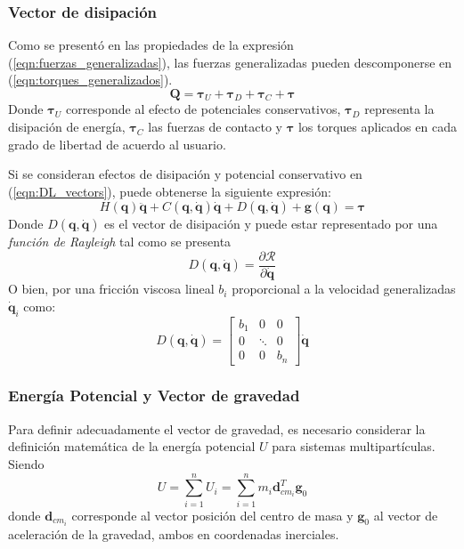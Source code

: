    \subsubsection{Vector de disipación}
    Como se presentó en las propiedades de la expresión (\ref{eqn:fuerzas_generalizadas}), las fuerzas generalizadas pueden descomponerse en (\ref{eqn:torques_generalizados}).
    \begin{equation}
        \label{eqn:torques_generalizados}
         \boldsymbol{Q} = \boldsymbol{\tau}_U + \boldsymbol{\tau}_D + \boldsymbol{\tau}_C + \boldsymbol{\tau}
    \end{equation}
    Donde $\boldsymbol{\tau}_U$ corresponde al efecto de potenciales conservativos, $\boldsymbol{\tau}_D$ representa la disipación de energía, $\boldsymbol{\tau}_C$
    las fuerzas de contacto y $\boldsymbol{\tau}$ los torques aplicados en cada grado de libertad de acuerdo al usuario. 
    
    Si se consideran efectos de disipación y potencial conservativo en (\ref{eqn:DL_vectors}), puede obtenerse la siguiente expresión:
    \begin{equation}
        \label{eqn:DL_final}
        H(\boldsymbol{q}) \boldsymbol{\ddot{q}} + C(\boldsymbol{q}, \boldsymbol{\dot{q}}) \boldsymbol{\dot{q}} + D(\boldsymbol{q}, \boldsymbol{\dot{q}})
        + \boldsymbol{g}(\boldsymbol{q}) = \boldsymbol{\tau}
    \end{equation}
    Donde $D(\boldsymbol{q}, \boldsymbol{\dot{q}})$ es el vector de disipación y puede estar representado por una \emph{función de Rayleigh} tal como se presenta
    \begin{equation}
        \label{eqn:disipacion_ray}
        D(\boldsymbol{q}, \boldsymbol{\dot{q}}) = \frac{\partial \mathcal{R}}{\partial \boldsymbol{\dot{q}}}
    \end{equation} 
    O bien, por una fricción viscosa lineal $b_i$ proporcional a la velocidad generalizadas $\boldsymbol{\dot{q}}_i$ como:
    \begin{equation}
        \label{eqn:disipacion_simple}
        D(\boldsymbol{q}, \boldsymbol{\dot{q}}) = \begin{bmatrix} b_1 & 0 & 0 \\ 0 & \ddots & 0 \\ 0 & 0 & b_n  \end{bmatrix} \boldsymbol{\dot{q}} 
    \end{equation}

    \subsubsection{Energía Potencial y Vector de gravedad}
    Para definir adecuadamente el vector de gravedad, es necesario considerar la definición matemática de la energía potencial $U$ para sistemas multipartículas. Siendo
    \begin{equation}
        \label{eqn:energia_potencial}
         U = \sum_{i=1}^n U_i =  \sum_{i=1}^n m_i \boldsymbol{d}_{cm_i}^T \boldsymbol{g}_0
    \end{equation}
    donde $\boldsymbol{d}_{cm_i}$ corresponde al vector posición del centro de masa y $\boldsymbol{g}_0$ al vector de aceleración de la gravedad, ambos
    en coordenadas inerciales. 

